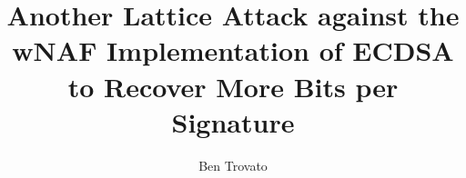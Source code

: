 \documentclass[sigconf]{acmart}
\begin{document}
%
\title{Another Lattice Attack against the wNAF Implementation of ECDSA to Recover More Bits per Signature}

\author{Ben Trovato}
%
%
%
%
%
%
%

\renewcommand{\shortauthors}{Trovato and Tobin, et al.}
\end{document}
